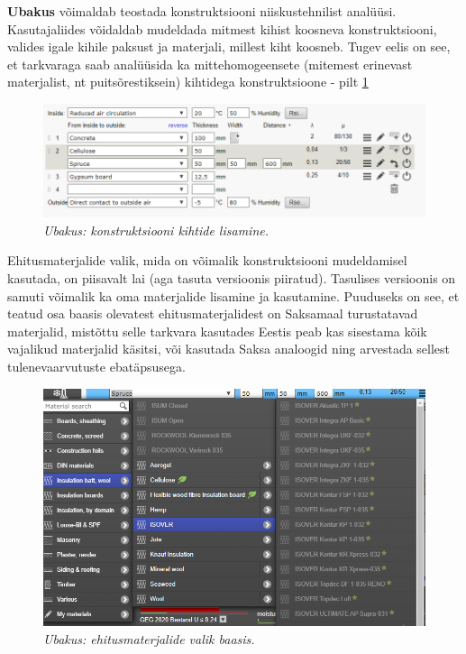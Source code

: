 \textbf{Ubakus} võimaldab teostada konstruktsiooni niiskustehnilist analüüsi. Kasutajaliides võidaldab 
mudeldada mitmest kihist koosneva konstruktsiooni, valides igale kihile paksust ja materjali, millest 
kiht koosneb. Tugev eelis on see, et tarkvaraga saab analüüsida ka mittehomogeensete (mitemest erinevast 
materjalist, nt puitsõrestiksein) kihtidega konstruktsioone - pilt \ref{fig:ubakus_layers}

\begin{figure}[ht]
    \centering
    \includegraphics[width=.6\textwidth]{figures/01_analogues/02_ubakus_layers.png}
    \caption{\textit{Ubakus: konstruktsiooni kihtide lisamine.}}
    \label{fig:ubakus_layers}
\end{figure}

Ehitusmaterjalide valik, mida on võimalik konstruktsiooni mudeldamisel kasutada, on piisavalt lai 
(aga tasuta versioonis piiratud). Tasulises versioonis on samuti võimalik ka oma materjalide 
lisamine ja kasutamine. Puuduseks on see, et teatud osa baasis olevatest ehitusmaterjalidest on Saksamaal
turustatavad materjalid, mistõttu selle tarkvara kasutades Eestis peab kas sisestama kõik vajalikud 
materjalid käsitsi, või kasutada Saksa analoogid ning arvestada sellest tulenevaarvutuste ebatäpsusega.
\begin{figure}[ht]
    \centering
    \includegraphics[width=.6\textwidth]{figures/01_analogues/03_ubakus_materials.png}
    \caption{\textit{Ubakus: ehitusmaterjalide valik baasis.}}
    \label{fig:ubakus_materials}
\end{figure}
